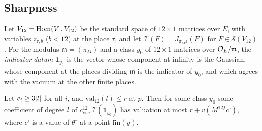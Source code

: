 \subsection{Sharpness}\label{ss:bound-attained}
Let $V_{12}=\operatorname{Hom}(V_1,V_{12})$ be the standard space of $12\times1$ matrices over $E$, with variables
$z_{\tau,b}$ ($b<12$) at the place $\tau$, and let $\mathcal T(F)=J_{\pi_M\mathsf a}(F)$ for
$F\in\mathcal S(V_{12})$. For the modulus $\mathfrak m=(\pi_M)$ and a class $y_0$ of $12\times1$ matrices over
$\mathcal{O}_E/\mathfrak m$, the \emph{indicator datum} $\mathbf 1_{y_0}$ is the vector whose component at infinity is
the Gaussian, whose component at the places dividing $\mathfrak m$ is the indicator of $y_0$, and which agrees
with the vacuum at the other finite places.

\begin{proposition}\label{prop:reduction-curve}
Let $c_i\ge3\lvert l\rvert$ for all $i$, and $\mathrm{val}_{12}(l)\le r$ at $p$. Then for some class $y_0$ some
coefficient of degree $l$ of $c_{\mathrm{vac}}^{12}\,\mathcal T(\mathbf 1_{y_0})$ has valuation at most
$r+v(M^{12f}c^\circ)$, where $c^\circ$ is a value of $\theta^\circ$ at a point $\mathrm{fin}(y)$.
\end{proposition}

